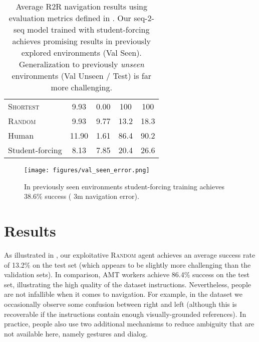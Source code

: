 \documentclass[10pt,twocolumn,letterpaper]{article}
\begin{document}
\begin{table}[]
\begin{center}
\begin{tabular}{lcccc}
			\textsc{Shortest}      &         9.93                  &       0.00                   &     100             &       100           \\
			\textsc{Random}      &         9.93                  &      9.77                    &      13.2            &      18.3            \\
			Human      &          11.90                 &            1.61              &       86.4           &        90.2         \\
			Student-forcing            &         8.13                 &      7.85                   &  20.4   &         26.6         \\       
			\midrule
		\end{tabular}
	\end{center}
	\caption{Average R2R navigation results using evaluation metrics defined in . Our seq-2-seq model trained with student-forcing achieves promising results in previously explored environments (Val Seen). Generalization to previously \textit{unseen} environments (Val Unseen / Test) is far more challenging. }
	\label{tab:results}
\end{table}


\begin{figure}[t]
	\begin{center}
		\texttt{[image: figures/val\_seen\_error.png]}
	\end{center}
	\caption{In previously seen environments student-forcing training achieves 38.6\% success ( 3m navigation error). }
	\label{fig:nav-error}
\end{figure}



\section{Results}
\label{sec:results}

As illustrated in , our exploitative \textsc{Random} agent achieves an average success rate of 13.2\% on the test set (which appears to be slightly more challenging than the validation sets). In comparison, AMT workers achieve 86.4\% success on the test set, illustrating the high quality of the dataset instructions. Nevertheless, people are not infallible when it comes to navigation. For example, in the dataset we occasionally observe some confusion between right and left (although this is recoverable if the instructions contain enough visually-grounded references). In practice, people also use two additional mechanisms to reduce ambiguity that are not available here, namely gestures and dialog.
\end{document}
